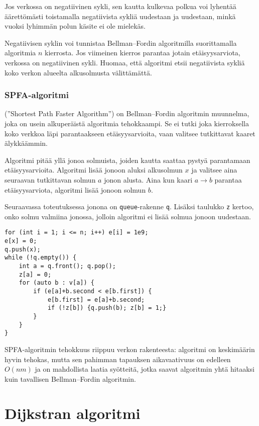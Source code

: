 Jos verkossa on negatiivinen sykli,
sen kautta kulkevaa polkua voi lyhentää äärettömästi
toistamalla negatiivista sykliä uudestaan ja uudestaan,
minkä vuoksi lyhimmän polun käsite ei ole mielekäs.

Negatiivisen syklin voi tunnistaa
Bellman–Fordin algoritmilla
suorittamalla algoritmia $n$ kierrosta.
Jos viimeinen kierros parantaa jotain
etäisyysarviota, verkossa on negatiivinen sykli.
Huomaa, että algoritmi etsii negatiivista sykliä
koko verkon alueelta alkusolmusta välittämättä.

\subsubsection{SPFA-algoritmi}


 (''Shortest Path Faster Algorithm'')
on Bellman–Fordin algoritmin muunnelma,
joka on usein alkuperäistä algoritmia tehokkaampi.
Se ei tutki joka kierroksella koko verkkoa läpi
parantaakseen etäisyysarvioita, vaan valitsee
tutkittavat kaaret älykkäämmin.

Algoritmi pitää yllä jonoa solmuista,
joiden kautta saattaa pystyä parantamaan etäisyysarvioita.
Algoritmi lisää jonoon aluksi alkusolmun $x$
ja valitsee aina seuraavan
tutkittavan solmun $a$ jonon alusta.
Aina kun kaari $a \rightarrow b$ parantaa
etäisyysarviota, algoritmi lisää jonoon solmun $b$.

Seuraavassa toteutuksessa jonona on \texttt{queue}-rakenne
\texttt{q}. Lisäksi taulukko \texttt{z} kertoo,
onko solmu valmiina jonossa, jolloin algoritmi ei
lisää solmua jonoon uudestaan.

\begin{lstlisting}
for (int i = 1; i <= n; i++) e[i] = 1e9;
e[x] = 0;
q.push(x);
while (!q.empty()) {
    int a = q.front(); q.pop();
    z[a] = 0;
    for (auto b : v[a]) {
        if (e[a]+b.second < e[b.first]) {
            e[b.first] = e[a]+b.second;
            if (!z[b]) {q.push(b); z[b] = 1;}
        }
    }
}
\end{lstlisting}

SPFA-algoritmin tehokkuus riippuu verkon rakenteesta:
algoritmi on keskimäärin hyvin tehokas, mutta
sen pahimman tapauksen aikavaativuus on edelleen
$O(nm)$ ja on mahdollista
laatia syötteitä, jotka saavat algoritmin yhtä hitaaksi
kuin tavallisen Bellman–Fordin algoritmin.

\section{Dijkstran algoritmi}

